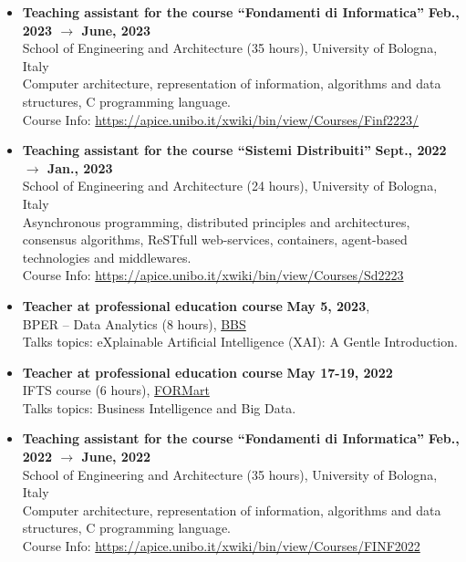 \documentclass[11pt]{article}
\begin{document}
\begin{itemize}
	\item \textbf{ Teaching assistant for the course ``Fondamenti di Informatica'' }\hfill \textbf{Feb., 2023 $\rightarrow$ June, 2023}
	\\School of Engineering and Architecture (35 hours), University of Bologna, Italy
	\\Computer architecture, representation of information, algorithms and data structures, C programming language.
	\\Course Info: \url{https://apice.unibo.it/xwiki/bin/view/Courses/Finf2223/}
	\item \textbf{ Teaching assistant for the course ``Sistemi Distribuiti'' }\hfill \textbf{Sept., 2022 $\rightarrow$ Jan., 2023}
	\\School of Engineering and Architecture (24 hours), University of Bologna, Italy
	\\Asynchronous programming, distributed principles and architectures, consensus algorithms, ReSTfull web-services, containers, agent-based technologies and middlewares.
	\\Course Info: \url{https://apice.unibo.it/xwiki/bin/view/Courses/Sd2223}
	\item \textbf{ Teacher at professional education course }\hfill \textbf{May 5, 2023},
	\\BPER -- Data Analytics (8 hours), \href{https://www.bbs.unibo.eu/}{BBS}
	\\Talks topics: eXplainable Artificial Intelligence (XAI): A Gentle Introduction.
	\item \textbf{ Teacher at professional education course }\hfill \textbf{May 17-19, 2022}
	\\IFTS course (6 hours), \href{http://www.formart.it/home}{FORMart}
	\\Talks topics: Business Intelligence and Big Data.
	\item \textbf{ Teaching assistant for the course ``Fondamenti di Informatica'' }\hfill \textbf{Feb., 2022 $\rightarrow$ June, 2022}
	\\School of Engineering and Architecture (35 hours), University of Bologna, Italy
	\\Computer architecture, representation of information, algorithms and data structures, C programming language.
	\\Course Info: \url{https://apice.unibo.it/xwiki/bin/view/Courses/FINF2022}
\end{itemize}
\end{document}
